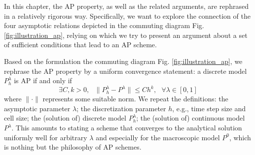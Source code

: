 \documentclass{report}
\begin{document}
In this chapter, the AP property, as well as the related arguments, are rephrased in a relatively rigorous way. Specifically, we want to explore the connection of the four asymptotic relations depicted in the commuting diagram Fig. \ref{fig:illustration_ap}, relying on which we try to present an argument about a set of sufficient conditions that lead to an AP scheme. 

Based on the formulation the commuting diagram Fig. \ref{fig:illustration_ap}, we rephrase the AP property by a uniform convergence statement: a discrete model $P^\lambda_h$ is AP if and only if
\begin{equation} \label{arg:ap}
    \exists C, k > 0,\ \ \  \|P^\lambda_h - P^\lambda\| \leq Ch^k,\ \ \ \forall \lambda \in [0,1]  
\end{equation}
where $\|\cdot\|$ represents some suitable norm.
We repeat the definitions: the asymptotic parameter $\lambda$; the discretization parameter $h$, e.g., time step size and cell size; the (solution of) discrete model $P^\lambda_h$; the (solution of)  continuous model $P^\lambda$. This amounts to stating a scheme that converges to the analytical solution uniformly well for arbitrary $\lambda$ and especially for the macroscopic model $P^0$, which is nothing but the philosophy of AP schemes. 
\end{document}

